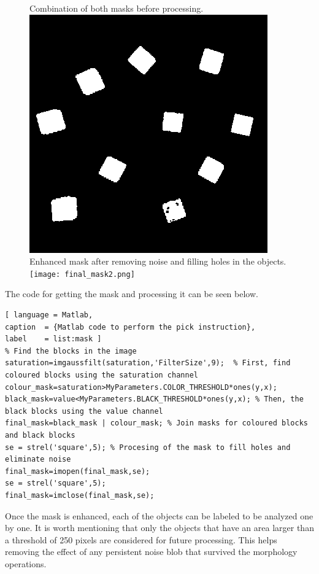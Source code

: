 \begin{figure}[H]
	\captionbox  %
	{
		Combination of both masks before processing.             
		\label{fig:final_mask}                                  
	}                                                                 
	{                                                                  
		\includegraphics[width=.25\textwidth]{figures/final_mask.png}         
	}                                                                    
	\hspace{5pt}                                                          
	\captionbox
	{       
		Enhanced mask after removing noise and filling holes in the objects.
		\label{fig:final_mask2}                                     
	}
	{
		\texttt{[image: final\_mask2.png]}            
	}                                                                             
\end{figure}

The code for getting the mask and processing it can be seen below.
%
\begin{lstlisting}[ language = Matlab,
caption  = {Matlab code to perform the pick instruction},
label    = list:mask ]
% Find the blocks in the image
saturation=imgaussfilt(saturation,'FilterSize',9);  % First, find coloured blocks using the saturation channel
colour_mask=saturation>MyParameters.COLOR_THRESHOLD*ones(y,x);
black_mask=value<MyParameters.BLACK_THRESHOLD*ones(y,x); % Then, the black blocks using the value channel
final_mask=black_mask | colour_mask; % Join masks for coloured blocks and black blocks
se = strel('square',5); % Procesing of the mask to fill holes and eliminate noise
final_mask=imopen(final_mask,se);
se = strel('square',5);
final_mask=imclose(final_mask,se);
\end{lstlisting}

Once the mask is enhanced, each of the objects can be labeled to be analyzed one by one. It is worth mentioning that only the objects that have an area larger than a threshold of 250 pixels are considered for future processing. This helps removing the effect of any persistent noise blob that survived the morphology operations.

